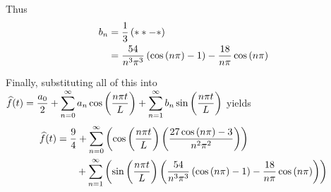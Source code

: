 Thus 
\begin{align*}
    b_n &= \frac{1}{3} \pars{\ast\ast - \ast}\\
    &=  \onpc{54} \pars{ \cosp{\np} - 1} - \onp{18} \cosp{\np}
\end{align*}

Finally, substituting all of this into  $\displaystyle \widehat{f}(t) = \frac{a_0}{2} + \sumn{0} a_n \cosp{\nptl} + \sumn{1} b_n \sinp{\nptl}$ yields
\begin{align*}
    \widehat{f}(t) &= \frac{9}{4} + \sumn0
    \pars{
        \cosp{\nptl} \pars{
            \frac{27\cosp{\np} - 3}{n^2 \pi^2}
        }
    }  \\
    & \qquad + \sumn1 \pars{
        \sinp{\nptl} \pars{
            \onpc{54} \pars{ \cosp{\np} - 1} - \onp{18} \cosp{\np}
        }
    }
\end{align*}

\newpage